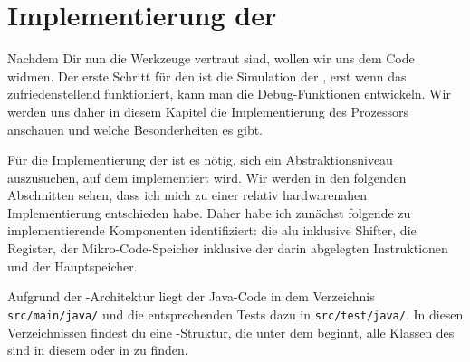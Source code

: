\chapter{Implementierung der \mic}
Nachdem Dir nun die Werkzeuge vertraut sind, wollen wir uns dem Code widmen. Der erste Schritt für den \md{} ist die Simulation der \mic{}, erst wenn das zufriedenstellend funktioniert, kann man die Debug-Funktionen entwickeln. Wir werden uns daher in diesem Kapitel die Implementierung des Prozessors anschauen und welche Besonderheiten es gibt.

Für die Implementierung der \mic{} ist es nötig, sich ein Abstraktionsniveau auszusuchen, auf dem implementiert wird. Wir werden in den folgenden Abschnitten sehen, dass ich mich zu einer relativ hardwarenahen Implementierung entschieden habe. Daher habe ich zunächst folgende zu implementierende Komponenten identifiziert: die \gls{alu} inklusive Shifter, die Register, der Mikro-Code-Speicher inklusive der darin abgelegten Instruktionen und der Hauptspeicher.

Aufgrund der \mvn{}-Architektur liegt der Java-Code in dem Verzeichnis \texttt{src/main/java/} und die entsprechenden Tests dazu in \texttt{src/test/java/}. In diesen Verzeichnissen findest du eine \package-Struktur, die unter dem \package{}  beginnt, alle Klassen des \md{} sind in diesem \package{} oder in \subpackages{} zu finden.

